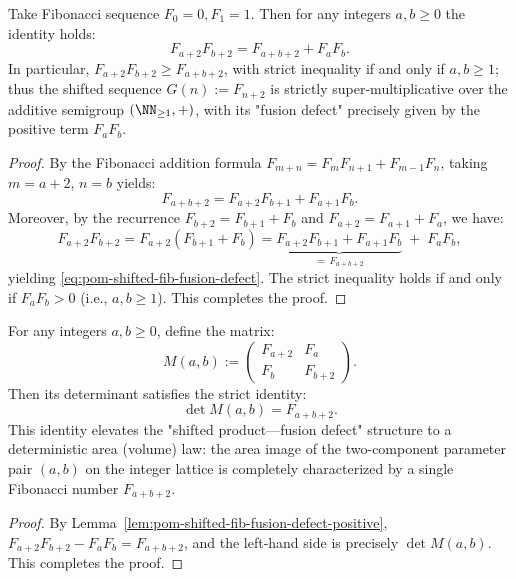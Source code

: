 \begin{lemma}\label{lem:pom-shifted-fib-fusion-defect-positive}
Take Fibonacci sequence $F_0=0,F_1=1$.
Then for any integers $a,b\ge 0$ the identity holds:
\begin{equation}\label{eq:pom-shifted-fib-fusion-defect}
\boxed{\;
F_{a+2}F_{b+2}=F_{a+b+2}+F_aF_b.\;}
\end{equation}
In particular,
\(
F_{a+2}F_{b+2}\ge F_{a+b+2}
\),
with strict inequality if and only if $a,b\ge 1$;
thus the shifted sequence $G(n):=F_{n+2}$ is strictly super-multiplicative over the additive semigroup $(\NN_{\ge 1},+)$,
with its "fusion defect" precisely given by the positive term $F_aF_b$.
\end{lemma}
\begin{proof}
By the Fibonacci addition formula
\(
F_{m+n}=F_mF_{n+1}+F_{m-1}F_n
\),
taking $m=a+2$, $n=b$ yields:
\[
F_{a+b+2}=F_{a+2}F_{b+1}+F_{a+1}F_b.
\]
Moreover, by the recurrence $F_{b+2}=F_{b+1}+F_b$ and $F_{a+2}=F_{a+1}+F_a$, we have:
\[
F_{a+2}F_{b+2}
=F_{a+2}(F_{b+1}+F_b)
=\underbrace{F_{a+2}F_{b+1}+F_{a+1}F_b}_{=\,F_{a+b+2}}
\;+\;F_aF_b,
\]
yielding \eqref{eq:pom-shifted-fib-fusion-defect}.
The strict inequality holds if and only if $F_aF_b>0$ (i.e., $a,b\ge 1$). This completes the proof.
\end{proof}

\begin{corollary}\label{cor:pom-fib-determinant-volume-law}
For any integers $a,b\ge 0$, define the matrix:
\[
M(a,b):=\begin{pmatrix}
F_{a+2} & F_a\\
F_b & F_{b+2}
\end{pmatrix}.
\]
Then its determinant satisfies the strict identity:
\[
\boxed{\;\det M(a,b)=F_{a+b+2}.\;}
\]
This identity elevates the "shifted product—fusion defect" structure to a deterministic area (volume) law: the area image of the two-component parameter pair $(a,b)$ on the integer lattice is completely characterized by a single Fibonacci number $F_{a+b+2}$.
\end{corollary}
\begin{proof}
By Lemma~\ref{lem:pom-shifted-fib-fusion-defect-positive},
\(
F_{a+2}F_{b+2}-F_aF_b=F_{a+b+2}
\),
and the left-hand side is precisely $\det M(a,b)$. This completes the proof.
\end{proof}

